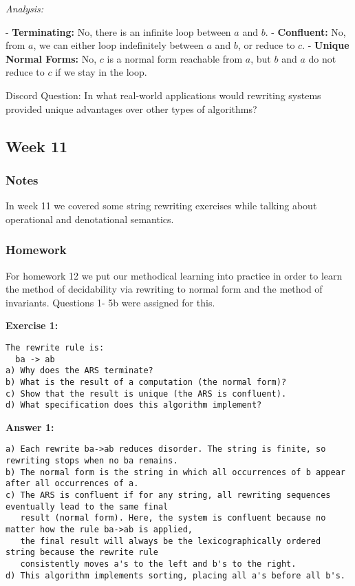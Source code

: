 \documentclass{article}
\theoremstyle{theorem}
\theoremstyle{definition}
\theoremstyle{remark}
\begin{document}
\textit{Analysis:}

- \textbf{Terminating:} No, there is an infinite loop between \( a \) and \( b \).
- \textbf{Confluent:} No, from \( a \), we can either loop indefinitely between \( a \) and \( b \), or reduce to \( c \).
- \textbf{Unique Normal Forms:} No, \( c \) is a normal form reachable from \( a \), but \( b \) and \( a \) do not reduce to \( c \) if we stay in the loop.

Discord Question: In what real-world applications would rewriting systems provided unique advantages over other types of algorithms?

\subsection{Week 11}
\subsubsection*{Notes}
In week 11 we covered some string rewriting exercises while talking about operational and denotational semantics.

\subsubsection*{Homework}
For homework 12 we put our methodical learning into practice in order to learn the method of decidability via rewriting to normal form and the method of invariants. Questions 1- 5b were assigned for this.

\textbf{Exercise 1:}
\begin{verbatim}
The rewrite rule is:
  ba -> ab
a) Why does the ARS terminate?
b) What is the result of a computation (the normal form)?
c) Show that the result is unique (the ARS is confluent).
d) What specification does this algorithm implement?
\end{verbatim}

\textbf{Answer 1:}
\begin{verbatim}
a) Each rewrite ba->ab reduces disorder. The string is finite, so rewriting stops when no ba remains.
b) The normal form is the string in which all occurrences of b appear after all occurrences of a.
c) The ARS is confluent if for any string, all rewriting sequences eventually lead to the same final 
   result (normal form). Here, the system is confluent because no matter how the rule ba->ab is applied, 
   the final result will always be the lexicographically ordered string because the rewrite rule 
   consistently moves a's to the left and b's to the right.
d) This algorithm implements sorting, placing all a's before all b's.
\end{verbatim}
\end{document}
